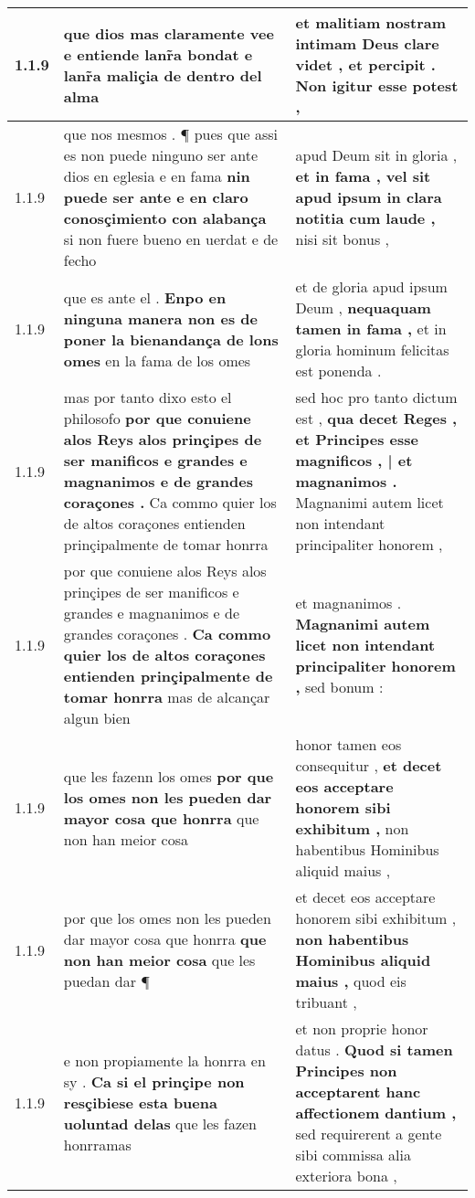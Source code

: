 \begin{tabular}{|p{1cm}|p{6.5cm}|p{6.5cm}|}
1.1.9 & que dios mas claramente vee \textbf{ e entiende lanr̃a bondat } e lanr̃a maliçia de dentro del alma & et malitiam nostram intimam Deus clare videt , \textbf{ et percipit . } Non igitur esse potest , \\\hline
1.1.9 & que nos mesmos . ¶ pues que assi es non puede ninguno ser ante dios en eglesia e en fama \textbf{ nin puede ser ante e en claro conosçimiento con alabança } si non fuere bueno en uerdat e de fecho & apud Deum sit in gloria , \textbf{ et in fama , vel sit apud ipsum in clara notitia cum laude , } nisi sit bonus , \\\hline
1.1.9 & que es ante el . \textbf{ Enpo en ninguna manera non es de poner la bienandança de lons omes } en la fama de los omes & et de gloria apud ipsum Deum , \textbf{ nequaquam tamen in fama , } et in gloria hominum felicitas est ponenda . \\\hline
1.1.9 & mas por tanto dixo esto el philosofo \textbf{ por que conuiene alos Reys alos prinçipes de ser manificos e grandes e magnanimos e de grandes coraçones . } Ca commo quier los de altos coraçones entienden prinçipalmente de tomar honrra & sed hoc pro tanto dictum est , \textbf{ qua decet Reges , et Principes esse magnificos , | et magnanimos . } Magnanimi autem licet non intendant principaliter honorem , \\\hline
1.1.9 & por que conuiene alos Reys alos prinçipes de ser manificos e grandes e magnanimos e de grandes coraçones . \textbf{ Ca commo quier los de altos coraçones entienden prinçipalmente de tomar honrra } mas de alcançar algun bien & et magnanimos . \textbf{ Magnanimi autem licet non intendant principaliter honorem , } sed bonum : \\\hline
1.1.9 & que les fazenn los omes \textbf{ por que los omes non les pueden dar mayor cosa que honrra } que non han meior cosa & honor tamen eos consequitur , \textbf{ et decet eos acceptare honorem sibi exhibitum , } non habentibus Hominibus aliquid maius , \\\hline
1.1.9 & por que los omes non les pueden dar mayor cosa que honrra \textbf{ que non han meior cosa } que les puedan dar ¶ & et decet eos acceptare honorem sibi exhibitum , \textbf{ non habentibus Hominibus aliquid maius , } quod eis tribuant , \\\hline
1.1.9 & e non propiamente la honrra en sy . \textbf{ Ca si el prinçipe non resçibiese esta buena uoluntad delas } que les fazen honrramas & et non proprie honor datus . \textbf{ Quod si tamen Principes non acceptarent hanc affectionem dantium , } sed requirerent a gente sibi commissa alia exteriora bona , \\\hline

\end{tabular}
